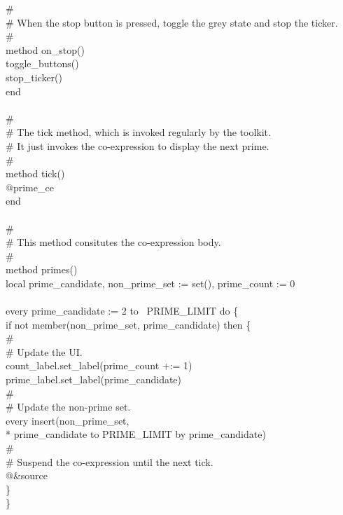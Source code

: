 {\>\# \\
\>\# When the stop button is pressed, toggle the grey state and stop the ticker. \\
\>\#  \\
\>method on\_stop() \\
\>\>toggle\_buttons() \\
\>\>stop\_ticker() \\
\>end \\
\ \\
\>\# \\
\>\# The tick method, which is invoked regularly by the toolkit. \\
\>\# It just invokes the co-expression to display the next prime. \\
\>\# \\
\>method tick() \\
\>\>@prime\_ce \\
\>end \\
\ \\
\>\# \\
\>\# This method consitutes the co-expression body. \\
\>\# \\
\>method primes() \\
\>\>local prime\_candidate, non\_prime\_set := set(), prime\_count := 0 \\
\ \\
\>\>every prime\_candidate := 2 to \ PRIME\_LIMIT do \{ \\
\>\>\>if not member(non\_prime\_set, prime\_candidate) then \{ \\
\>\>\>\>\# \\
\>\>\>\>\# Update the UI. \\
\>\>\>\>count\_label.set\_label(prime\_count +:= 1) \\
\>\>\>\>prime\_label.set\_label(prime\_candidate) \\
\>\>\>\>\# \\
\>\>\>\>\# Update the non-prime set. \\
\>\>\>\>every insert(non\_prime\_set,\\
\>\>\>\> * prime\_candidate to PRIME\_LIMIT by prime\_candidate) \\
\>\>\>\>\# \\
\>\>\>\>\# Suspend the co-expression until the next tick. \\
\>\>\>\>@\&source \\
\>\>\>\>\} \\
\>\>\>\} \\
}

